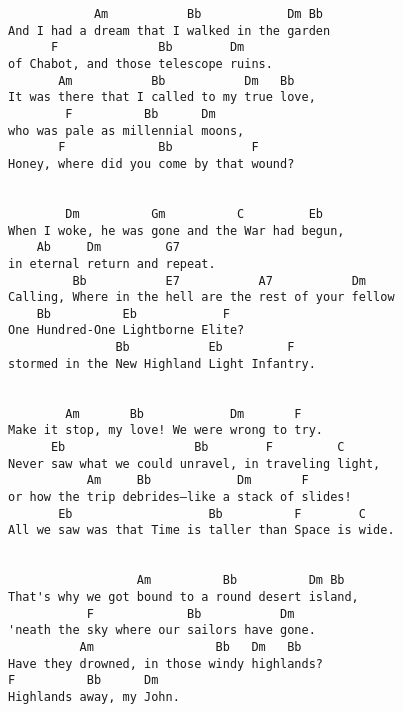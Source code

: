 \documentclass[leqno]{memoir}
\begin{document}
\begin{verbatim}
            Am           Bb            Dm Bb
And I had a dream that I walked in the garden
      F              Bb        Dm
of Chabot, and those telescope ruins.
       Am           Bb           Dm   Bb
It was there that I called to my true love,
        F          Bb      Dm
who was pale as millennial moons,
       F             Bb           F
Honey, where did you come by that wound?


        Dm          Gm          C         Eb
When I woke, he was gone and the War had begun,
    Ab     Dm         G7
in eternal return and repeat.
         Bb           E7           A7           Dm
Calling, Where in the hell are the rest of your fellow
    Bb          Eb            F
One Hundred-One Lightborne Elite?
               Bb           Eb         F
stormed in the New Highland Light Infantry.


        Am       Bb            Dm       F
Make it stop, my love! We were wrong to try.
      Eb                  Bb        F         C
Never saw what we could unravel, in traveling light,
           Am     Bb            Dm       F
or how the trip debrides—like a stack of slides!
       Eb                   Bb          F        C
All we saw was that Time is taller than Space is wide.


                  Am          Bb          Dm Bb
That's why we got bound to a round desert island,
           F             Bb           Dm
'neath the sky where our sailors have gone.
          Am                 Bb   Dm   Bb
Have they drowned, in those windy highlands?
F          Bb      Dm
Highlands away, my John. 

\end{verbatim}
\newpage
\end{document}
